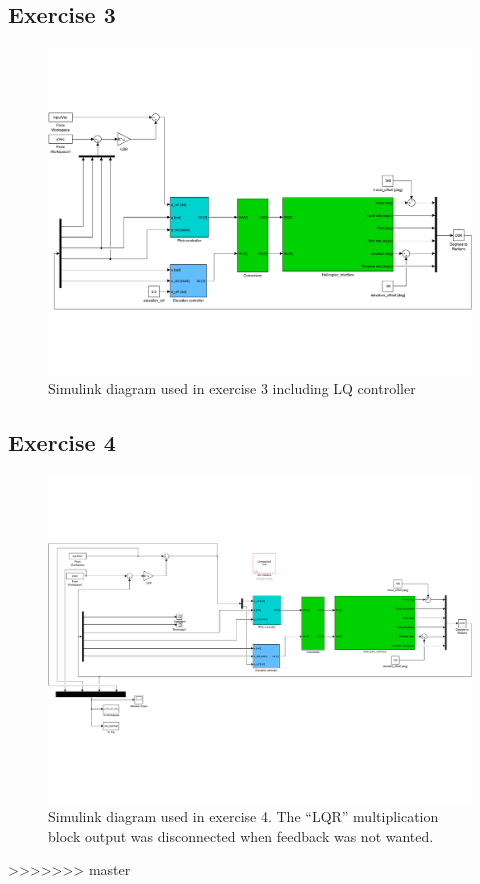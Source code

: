 \begin{appendices}
\subsection*{Exercise 3}

\begin{figure}[h]

    \includegraphics[width=\textwidth]{ex3sim.pdf}

    \caption{Simulink diagram used in exercise 3 including LQ controller}

    \label{fig:simulink_LQ}

\end{figure}

\subsection*{Exercise 4}

\begin{figure}[h]

    \includegraphics[width=\textwidth]{ex4sim.pdf}

    \caption{Simulink diagram used in exercise 4. The ``LQR'' multiplication block output was disconnected when feedback was not wanted.}

\end{figure}

\end{appendices}
>>>>>>> master
